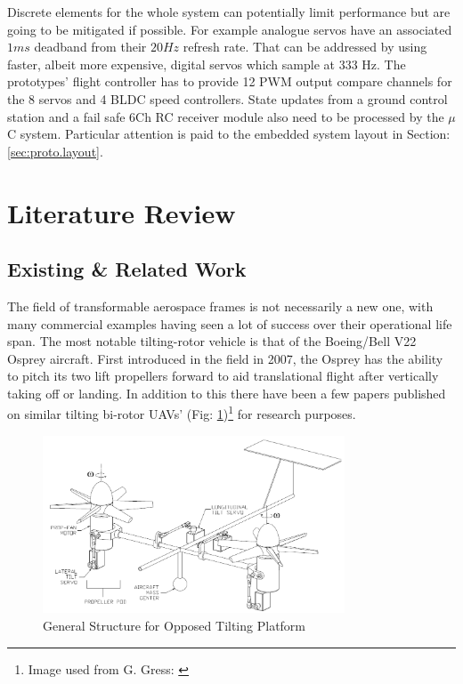 \par
Discrete elements for the whole system can potentially limit performance but are going to be mitigated if possible. For example analogue servos have an associated $1 ms$ deadband from their $20 Hz$ refresh rate. That can be addressed by using faster, albeit more expensive, digital servos which sample at 333 Hz. The prototypes' flight controller has to provide 12 PWM output compare channels for the 8 servos and 4 BLDC speed controllers. State updates from a ground control station and a fail safe 6Ch RC receiver module also need to be processed by the $\mu$C system. Particular attention is paid to the embedded system layout in Section:\ref{sec:proto.layout}.
\section{Literature Review}
\label{sec:intro.litreview}
\subsection{Existing \& Related Work}
\label{subsec:intro.lit.related}
The field of transformable aerospace frames is not necessarily a new one, with many commercial examples having seen a lot of success over their operational life span. The most notable tilting-rotor vehicle is that of the Boeing/Bell V22 Osprey aircraft. First introduced in the field in 2007, the Osprey has the ability to pitch its two lift propellers forward to aid translational flight after vertically taking off or landing. In addition to this there have been a few papers published on similar tilting bi-rotor UAVs' (Fig: \ref{fig:dualaxistilt})\footnote{Image used from G. Gress: \cite{gres2007}} for research purposes.
\begin{figure}[hbtp]
\centering
\includegraphics[width=0.8\textwidth]{figs/dualaxistilt}
\caption{General Structure for Opposed Tilting Platform}
\label{fig:dualaxistilt}
\end{figure}
